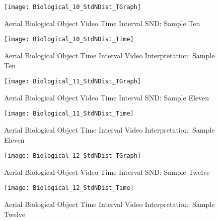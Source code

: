 \newpage  %


\begin{figure}[H]
	\center 
	\texttt{[image: Biological\_10\_StdNDist\_TGraph]}
	\captionsetup{list=no}
	\caption[Aerial Biological Object Video Time Interval SND: Sample Ten]{Aerial Biological Object Video Time Interval SND: Sample Ten}
\end{figure}

\begin{figure}[H]
	\center 
	\texttt{[image: Biological\_10\_StdNDist\_Time]}
	\captionsetup{list=no}	
	\caption[Aerial Biological Object Time Interval Video Interpretation: Sample Ten]{Aerial Biological Object Time Interval Video Interpretation: Sample Ten}
\end{figure}

\newpage  %


\begin{figure}[H]
	\center 
	\texttt{[image: Biological\_11\_StdNDist\_TGraph]}
	\captionsetup{list=no}	
	\caption[Aerial Biological Object Video Time Interval SND: Sample Eleven]{Aerial Biological Object Video Time Interval SND: Sample Eleven}
\end{figure}

\begin{figure}[H]
	\center 
	\texttt{[image: Biological\_11\_StdNDist\_Time]}
	\captionsetup{list=no}	
	\caption[Aerial Biological Object Time Interval Video Interpretation: Sample Eleven]{Aerial Biological Object Time Interval Video Interpretation: Sample Eleven}
\end{figure}

\newpage  %


\begin{figure}[H]
	\center 
	\texttt{[image: Biological\_12\_StdNDist\_TGraph]}
	\captionsetup{list=no}	
	\caption[Aerial Biological Object Video Time Interval SND: Sample Twelve]{Aerial Biological Object Video Time Interval SND: Sample Twelve}
\end{figure}

\begin{figure}[H]
	\center 
	\texttt{[image: Biological\_12\_StdNDist\_Time]}
	\captionsetup{list=no}	
	\caption[Aerial Biological Object Time Interval Video Interpretation: Sample Twelve]{Aerial Biological Object Time Interval Video Interpretation: Sample Twelve}
\end{figure}

